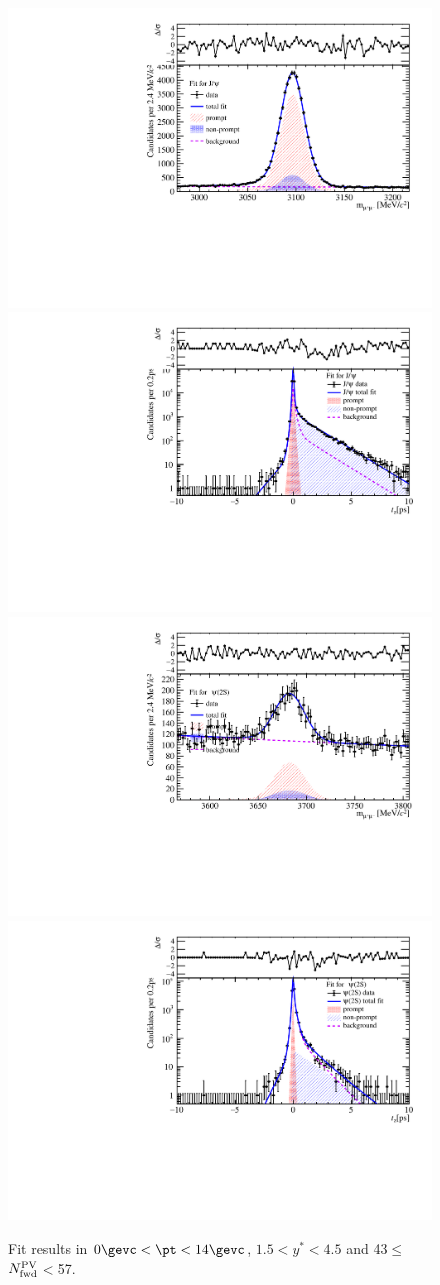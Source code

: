 \begin{figure}[H]
\begin{center}
\includegraphics[width=0.45\linewidth]{pdf/pPb/FWorkdir/TwoDimFit/ProjMass/Jpsi_n3y1pt1.pdf}
\includegraphics[width=0.45\linewidth]{pdf/pPb/FWorkdir/TwoDimFit/ProjTz/Jpsi_n3y1pt1.pdf}
\vspace*{-0.5cm}
\includegraphics[width=0.45\linewidth]{pdf/pPb/FWorkdir/TwoDimFit/ProjMass/Psi2S_n3y1pt1.pdf}
\includegraphics[width=0.45\linewidth]{pdf/pPb/FWorkdir/TwoDimFit/ProjTz/Psi2S_n3y1pt1.pdf}
\vspace*{-0.5cm}
\end{center}
\caption{Fit results in $0\gevc<\pt<14\gevc$, $1.5<y^*<4.5$ and 43$\leq$$N_{\rm fwd}^{\rm PV}$$<$57.}
\end{figure}
